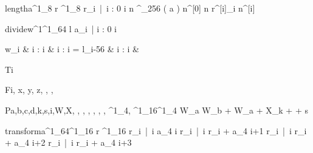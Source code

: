 \documentclass[12pt,a4paper]{book}
\begin{document}
\begin{eqcode}{length}{a}{}{^1_8}
    r \in {}^1_8 \lend
    r_i\  |\  i : 0 \leq i   \lend
     n ^{\lfloor \log_{256} \left ( a \right ) \rfloor } \lend
    n^{[0]} \gets n \lend
    r^{[i]}_i \gets {} \lend
    n^{[i]} \gets {} \lend
     \lend
\end{eqcode}

\begin{eqcode}{divide}{w}{^1}{^1_{64}}
    l \gets {} \lend
    a_i\   |  i : 0 \leq i \ \gets
        \begin{cases}
            w_i & i : i \leq {} \lend
              & i : i =  \lend
            l_{i-56} & i : i   & \otherwise \lend
        \end{cases} \lend
     \lend
\end{eqcode}

\begin{eqcode}{T}{i}{}{}
     \lend
\end{eqcode}

\begin{eqcode}{F}{i, x, y, z}{, , ,
}{}
        \lend
       \lend
       \lend
       \lend
    \qendif
\end{eqcode}

\begin{eqcode}{P}{a,b,c,d,k,s,i,W,X}{, , ,
, , , , ^1_4,
^1_{16}}{^1_4}
    W_a \gets W_b + {{W_a + X_k +   + } \ll s } \lend
     \lend
\end{eqcode}

\begin{eqcode}{transform}{a}{^1_{64}}{^1_{16}}
    r \in {}^1_{16} \lend
    r_i\  |\  \forall i \gets a_{4 \cdot i}  \lend
    r_i\  |\  \forall i \gets r_i + a_{4 \cdot i+1}  \lend
    r_i\  |\  \forall i \gets r_i + a_{4 \cdot i+2}  \lend
    r_i\  |\  \forall i  \gets r_i + a_{4 \cdot i+3} \lend
     \lend
\end{eqcode}
\end{document}
